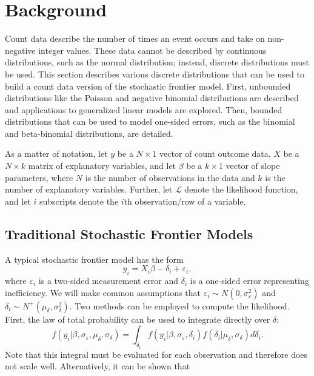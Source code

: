 \documentclass{article}
\newcommand{\lik}{\mathcal{L}}
\newcommand{\ep}{\varepsilon}
\begin{document}
\section{Background}

Count data describe the number of times an event occurs and take on non-negative integer values. These data cannot be described by continuous distributions, such as the normal distribution; instead, discrete distributions must be used. This section describes various discrete distributions that can be used to build a count data version of the stochastic frontier model. First, unbounded distributions like the Poisson and negative binomial distributions are described and applications to generalized linear models are explored. Then, bounded distributions that can be used to model one-sided errors, such as the binomial and beta-binomial distributions, are detailed.

As a matter of notation, let $y$ be a $N\times 1$ vector of count outcome data, $X$ be a $N\times k$ matrix of explanatory variables, and let $\beta$ be a $k\times 1$ vector of slope parameters, where $N$ is the number of observations in the data and $k$ is the number of explanatory variables. Further, let $\lik$ denote the likelihood function, and let $i$ subscripts denote the $i$th observation/row of a variable.

\subsection{Traditional Stochastic Frontier Models}

A typical stochastic frontier model has the form
\begin{equation}
y_i = X_i\beta - \delta_i + \ep_i,
\end{equation}
where $\ep_i$ is a two-sided measurement error and $\delta_i$ is a one-sided error representing inefficiency. We will make common assumptions that $\ep_i\sim N(0, \sigma_\ep^2)$ and $\delta_i\sim N^+(\mu_\delta, \sigma_\delta^2)$. Two methods can be employed to compute the likelihood. First, the law of total probability can be used to integrate directly over $\delta$:
\begin{equation}
	f(y_i | \beta, \sigma_\ep, \mu_\delta, \sigma_\delta) = \int_{\delta_i} f(y_i | \beta, \sigma_\ep, \delta_i) f(\delta_i | \mu_\delta, \sigma_\delta) d\delta_i.
\end{equation}
Note that this integral must be evaluated for each observation and therefore does not scale well. Alternatively, it can be shown that
\begin{equation}
	
\end{equation}
\end{document}
